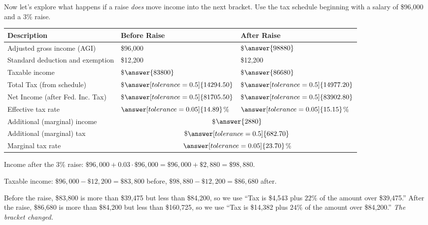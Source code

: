 \documentclass[12pt]{ximera}
\begin{document}
\begin{problem}
Now let's explore what happens if a raise \emph{does} move income into the next
bracket. Use the tax schedule beginning with a salary of \$96,000 and a $3\%$ raise.

\begin{center}
\begin{tabular}{|l|l|l|}
\hline
Description & Before Raise & After Raise \\
\hline
Adjusted gross income (AGI) & \$96,000 & \$$\answer{98880}$ \\
\hline
Standard deduction and exemption & \$12,200 & \$12,200 \\
\hline
Taxable income & \$$\answer{83800}$ & \$$\answer{86680}$ \\
\hline
Total Tax (from schedule) & \$$\answer[tolerance=0.5]{14294.50}$ & \$$\answer[tolerance=0.5]{14977.20}$ \\
\hline
Net Income (after Fed. Inc. Tax) & \$$\answer[tolerance=0.5]{81705.50}$ & \$$\answer[tolerance=0.5]{83902.80}$ \\
\hline
Effective tax rate & $\answer[tolerance=0.05]{14.89}$\% & $\answer[tolerance=0.05]{15.15}$\% \\
\hline
Additional (marginal) income & \multicolumn{2}{c|}{\$$\answer{2880}$} \\
\hline
Additional (marginal) tax & \multicolumn{2}{c|}{\$$\answer[tolerance=0.5]{682.70}$} \\
\hline
Marginal tax rate & \multicolumn{2}{c|}{$\answer[tolerance=0.05]{23.70}$\%} \\
\hline
\end{tabular}
\end{center}

\begin{solution}
Income after the $3\%$ raise:
$\$96{,}000 + 0.03 \cdot \$96{,}000 = \$96{,}000 + \$2{,}880 = \$98{,}880$.

Taxable income: $\$96{,}000 - \$12{,}200 = \$83{,}800$ before,
$\$98{,}880 - \$12{,}200 = \$86{,}680$ after.

Before the raise, \$83,800 is more than \$39,475 but less than \$84,200, so we use
``Tax is \$4,543 plus $22\%$ of the amount over \$39,475.'' After the raise,
\$86,680 is more than \$84,200 but less than \$160,725, so we use ``Tax is \$14,382
plus $24\%$ of the amount over \$84,200.'' \emph{The bracket changed.}


\end{solution}
\end{problem}
\end{document}
